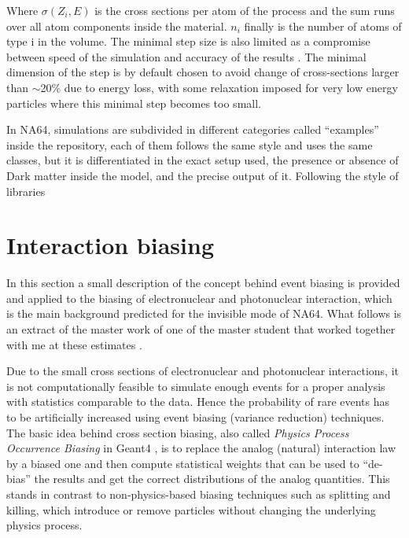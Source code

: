 Where $\sigma(Z_i,E)$ is the cross sections per atom of the process and the sum runs over all atom components inside the material. $n_i$ finally is the number of atoms of type i in the volume. The minimal step size is also limited as a compromise between speed of the simulation and accuracy of the results \cite{geant4-phys-guide}. The minimal dimension of the step is by default chosen to avoid change of cross-sections larger than $\sim$20\% due to energy loss, with some relaxation imposed for very low energy particles where this minimal step becomes too small.

In NA64, simulations are subdivided in different categories called ``examples'' inside the repository, each of them follows the same style and uses the same classes, but it is differentiated in the exact setup used, the presence or absence of Dark matter inside the model, and the precise output of it. Following the style of libraries


\section{Interaction biasing}
\label{appC:sec:physics-list}

In this section a small description of the concept behind event biasing is provided and applied to the biasing of electronuclear and photonuclear interaction, which is the main background predicted for the invisible mode of NA64. What follows is an extract of the master work of one of the master student that worked together with me at these estimates \cite{pdegen-thesis}.

Due to the small cross sections of electronuclear and photonuclear interactions, it is not computationally feasible to simulate enough events for a proper analysis with statistics comparable to the data. Hence the probability of rare events has to be artificially increased using event biasing (variance reduction) techniques. The basic idea behind cross section biasing, also called \textit{Physics Process Occurrence Biasing} in Geant4 \cite{G4bias}, is to replace the analog (natural) interaction law by a biased one and then compute statistical weights that can be used to ``de-bias'' the results and get the correct distributions of the analog quantities. This stands in contrast to non-physics-based biasing techniques such as splitting and killing, which introduce or remove particles without changing the underlying physics process.

